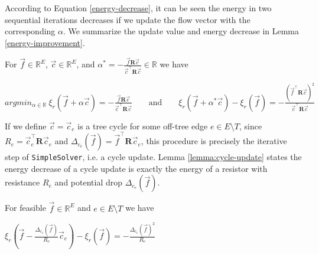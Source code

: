 According to Equation \ref{energy-decrease}, it can be seen the energy in two sequential iterations decreases if we update the flow vector with the corresponding $\alpha$.
We summarize the update value and energy decrease in Lemma \ref{energy-improvement}.
\begin{lemma}
    \label{energy-improvement}
    For $\overrightarrow{f} \in \mathds{R}^E$, $\overrightarrow{c} \in \mathds{R}^E$, and $\alpha^*=-\frac{\overrightarrow{f} \mathbf{R} \overrightarrow{c}}{\overrightarrow{c}^\top \mathbf{R} \overrightarrow{c}} \in \mathds{R}$ we have
    \begin{center}
        $argmin_{\alpha \in \mathds{R}}~ \xi_r(\overrightarrow{f}+\alpha \overrightarrow{c})=-\frac{\overrightarrow{f} \mathbf{R} \overrightarrow{c}}{\overrightarrow{c}^\top \mathbf{R} \overrightarrow{c}} \text{~~~~~ and ~~~~~}\xi_r(\overrightarrow{f}+\alpha^* \overrightarrow{c}) - \xi_r(\overrightarrow{f})=-\frac{(\overrightarrow{f}^\top \mathbf{R} \overrightarrow{c})^2}{\overrightarrow{c}^\top \mathbf{R} \overrightarrow{c}}$
    \end{center}
\end{lemma}
If we define $\overrightarrow{c}=\overrightarrow{c}_e$ is a tree cycle for some off-tree edge $e \in E \setminus T$, since $R_e= \overrightarrow{c}_e^\top \mathbf{R} \overrightarrow{c}_e$ and $\Delta_{c_e}(\overrightarrow{f})=\overrightarrow{f}^\top \mathbf{R} \overrightarrow{c}_e$, this procedure is precisely the iterative step of \texttt{SimpleSolver}, i.e. a cycle update. Lemma \ref{lemma:cycle-update} states the energy decrease of a cycle update is exactly the energy of a resistor with resistance $R_e$ and potential drop $\Delta_{c_e}(\overrightarrow{f})$.
\begin{lemma}
    \label{lemma:cycle-update}
    For feasible $\overrightarrow{f} \in \mathds{R}^E$ and $e \in E \setminus T$ we have
    \begin{center}
        $\xi_r(\overrightarrow{f}-\frac{\Delta_{c_e}(\overrightarrow{f})}{R_e} \overrightarrow{c}_e) - \xi_r(\overrightarrow{f})=-\frac{\Delta_{c_e}(\overrightarrow{f})^2}{R_e}$
    \end{center}
\end{lemma}

